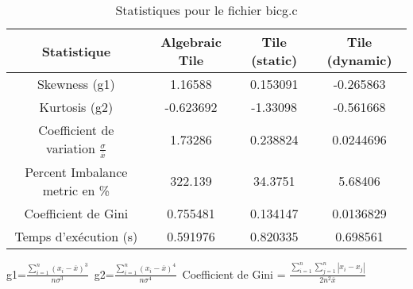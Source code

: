 \documentclass{article}
\begin{document}
\begin{table}[htbp]
  \centering
  \caption{Statistiques pour le fichier bicg.c}
  \begin{tabular}{|c|c|c|c|}
    \hline
    Statistique & Algebraic Tile & Tile (static) & Tile (dynamic) \\ 
    \hline
    Skewness (g1)  & 1.16588 & 0.153091 & -0.265863 \\ 
    Kurtosis (g2)  & -0.623692 & -1.33098 & -0.561668 \\ 
    Coefficient de variation $ \frac{\sigma}{\overline{x}} $ & 1.73286 & 0.238824 & 0.0244696\\ 
    Percent Imbalance metric en \% & 322.139 & 34.3751 & 5.68406\\ 
    Coefficient de Gini  & 0.755481 & 0.134147 & 0.0136829\\ 
    Temps d'exécution (s) &  0.591976    &  0.820335   &  0.698561   \\ 

    \hline
  \end{tabular}
\end{table}
g1=$ \frac{\sum_{i=1}^{n} (x_i - \overline{x})^3}{n\sigma^3} $\
g2=$ \frac{\sum_{i=1}^{n} (x_i - \overline{x})^4}{n\sigma^4} $\
Coefficient de Gini = $ \frac{\sum_{i=1}^{n}\sum_{j=1}^{n} |x_i - x_j|}{2n^2\overline{x}} $\
\newpage
\end{document}

